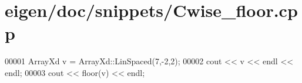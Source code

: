 \hypertarget{eigen_2doc_2snippets_2_cwise__floor_8cpp_source}{}\section{eigen/doc/snippets/\+Cwise\+\_\+floor.cpp}
\label{eigen_2doc_2snippets_2_cwise__floor_8cpp_source}

\begin{DoxyCode}
00001 ArrayXd v = ArrayXd::LinSpaced(7,-2,2);
00002 cout << v << endl << endl;
00003 cout << floor(v) << endl;
\end{DoxyCode}
